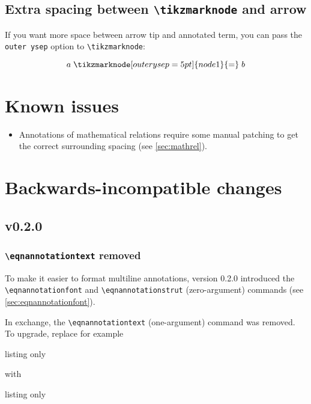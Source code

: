 \documentclass{article}
\begin{document}
\subsection{Extra spacing between \texttt{\textbackslash{}tikzmarknode} and arrow}
\label{sec:outerysep}

If you want more space between arrow tip and annotated term, you can pass the \texttt{outer ysep} option to \texttt{\textbackslash{}tikzmarknode}:
\begin{LTXexample}[text outside listing,lefthand width=0.5in]
\[
a \mathrel{\tikzmarknode[outer ysep=5pt]{node1}{=}} b
\]
\end{LTXexample}



\section{Known issues}

\begin{itemize}
    \item Annotations of mathematical relations require some manual patching to get the correct surrounding spacing (see \cref{sec:mathrel}).

\end{itemize}


\section{Backwards-incompatible changes}

\subsection*{v0.2.0}

\subsubsection*{\texttt{\textbackslash{}eqnannotationtext} removed}

To make it easier to format multiline annotations, version 0.2.0 introduced the \verb|\eqnannotationfont| and \verb|\eqnannotationstrut| (zero-argument) commands (see \cref{sec:eqnannotationfont}).

In exchange, the \verb|\eqnannotationtext| (one-argument) command was removed. To upgrade, replace for example
\begin{tcblisting}{listing only}
    \renewcommand{\eqnannotationtext}[1]{\sffamily\tiny#1\strut}
\end{tcblisting}
with
\begin{tcblisting}{listing only}
    \renewcommand{\eqnannotationfont}{\sffamily\tiny}
    \renewcommand{\eqnannotationstrut}{\strut}
\end{tcblisting}
\end{document}
